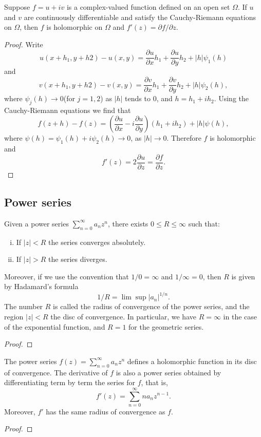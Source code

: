 \begin{theorem}
    Suppose $f=u+iv$ is a complex-valued function defined on an open set $\Omega$.
    If $u$ and $v$ are continuously differentiable and satisfy the Cauchy-Riemann equations
    on $\Omega$, then $f$ is holomorphic on $\Omega$ and $f'(z)=\partial f/\partial z$.
\end{theorem}
\begin{proof}
    Write
    \[
        u(x+h_1,y+h2)-u(x,y)=\frac{\partial u}{\partial x}h_1+
        \frac{\partial u}{\partial y}h_2+|h|\psi_1(h)
    \]
    and
    \[
        v(x+h_1,y+h2)-v(x,y)=\frac{\partial v}{\partial x}h_1+
        \frac{\partial v}{\partial y}h_2+|h|\psi_2(h),
    \]
    where $\psi_j(h)\to 0$(for $j=1,2$) as $|h|$ tends to $0$, and $h=h_1+ih_2$. Using
    the Cauchy-Riemann equations we find that
    \[
        f(z+h)-f(z)=(\frac{\partial u}{\partial x}-
        i\frac{\partial u}{\partial y})(h_1+ih_2)+|h|\psi(h),
    \]
    where $\psi(h)=\psi_1(h)+i\psi_2(h)\to 0$, as $|h|\to 0$.
    Therefore $f$ is holomorphic and
    \[
        f'(z)=2\frac{\partial u}{\partial z}=\frac{\partial f}{\partial z}.
    \]
\end{proof}

\subsection{Power series}

\begin{theorem}
    Given a power series $\sum_{n=0}^{\infty}a_n z^n$, there exists
    $0\le R\le \infty$ such that:
    \begin{enumerate}[(i)]
        \item If $|z|<R$ the series converges absolutely.
        \item If $|z|>R$ the series diverges.
    \end{enumerate}
    Moreover, if we use the convention that $1/0=\infty$ and $1/\infty=0$, then
    $R$ is given by Hadamard's formula
    \[
        1/R=\lim \sup |a_n|^{1/n}.
    \]
    The number $R$ is called the radius of convergence of the power series,
    and the region $|z|<R$ the disc of convergence. In particular, we have
    $R=\infty$ in the case of the exponential function, and $R=1$ for the
    geometric series.
\end{theorem}
\begin{proof}
\end{proof}

\begin{theorem}
    The power series $f(z)=\sum_{n=0}^{\infty}a_n z^n$ defines a holomorphic function
    in its disc of convergence. The derivative of $f$ is also a power series obtained by
    differentiating term by term the series for $f$, that is,
    \[
        f'(z)=\sum_{n=0}^{\infty}na_n z^{n-1}.
    \]
    Moreover, $f'$ has the same radius of convergence as $f$.
\end{theorem}
\begin{proof}
\end{proof}


